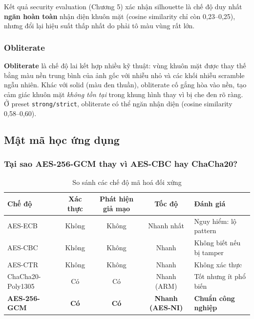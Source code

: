 Kết quả security evaluation (Chương 5) xác nhận silhouette là chế độ duy nhất \textbf{ngăn hoàn toàn} nhận diện khuôn mặt (cosine similarity chỉ còn 0{,}23--0{,}25), nhưng đổi lại hiệu suất thấp nhất do phải tô màu vùng rất lớn.

\subsubsection{Obliterate}
\label{subsubsec:obliterate}

\textbf{Obliterate} là chế độ lai kết hợp nhiều kỹ thuật: vùng khuôn mặt được thay thế bằng màu nền trung bình của ảnh gốc với nhiễu nhỏ và các khối nhiễu scramble ngẫu nhiên. Khác với solid (màu đen thuần), obliterate cố gắng hòa vào nền, tạo cảm giác khuôn mặt \textit{không tồn tại} trong khung hình thay vì bị che đen rõ ràng. Ở preset \texttt{strong/strict}, obliterate có thể ngăn nhận diện (cosine similarity 0{,}58--0{,}60).

\subsection{Mật mã học ứng dụng}
\label{subsec:matma}

\subsubsection{Tại sao AES-256-GCM thay vì AES-CBC hay ChaCha20?}
\label{subsubsec:whyaesgcm}

\begin{table}[H]
\centering
\caption{So sánh các chế độ mã hoá đối xứng}
\label{tab:cipher_compare}
{\small
\begin{tabular}{|l|c|c|c|p{3.8cm}|}
\hline
\textbf{Chế độ} & \textbf{Xác thực} & \textbf{Phát hiện giả mạo} & \textbf{Tốc độ} & \textbf{Đánh giá} \\
\hline
AES-ECB & Không & Không & Nhanh nhất & Nguy hiểm: lộ pattern \\
\hline
AES-CBC & Không & Không & Nhanh & Không biết nếu bị tamper \\
\hline
AES-CTR & Không & Không & Nhanh & Không xác thực \\
\hline
ChaCha20-Poly1305 & Có & Có & Nhanh (ARM) & Tốt nhưng ít phổ biến \\
\hline
\textbf{AES-256-GCM} & \textbf{Có} & \textbf{Có} & \textbf{Nhanh (AES-NI)} & \textbf{Chuẩn công nghiệp} \\
\hline
\end{tabular}
}
\end{table}


